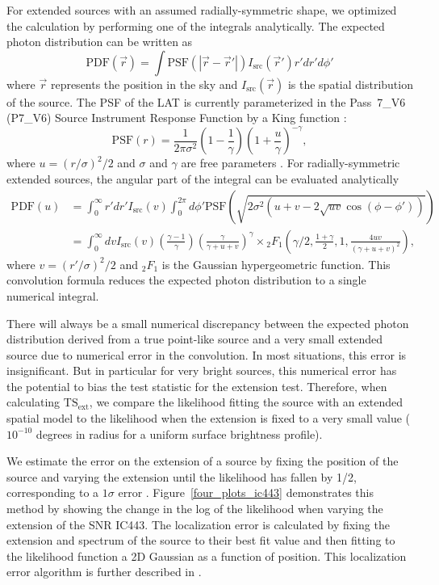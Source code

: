 \documentclass[12pt,preprint]{aastex}
\newcommand{\tsext}{{\ensuremath{\text{TS}_{\text{ext}}}}\xspace}
\begin{document}
For extended sources with an assumed radially-symmetric shape,
we optimized the calculation by performing one
of the integrals analytically.
The expected photon 
distribution can be written as
\begin{equation}
  \text{PDF}(\vec r) = \int  \text{PSF}(|\vec r - \vec r'|)I_\text{src}(\vec r') r' dr' d\phi'
\end{equation}
where $\vec r$ represents the position in the sky and
$I_\text{src}(\vec r)$ is the spatial distribution of the
source.
The PSF of the LAT is currently parameterized 
in the Pass~7\_V6 (P7\_V6) Source Instrument
Response Function \citep[IRFs,][]{lat_on_orbit_psf} by a King function \citep{king_function}:
\begin{equation}
  \text{PSF}(r) = 
  \frac{1}{2\pi\sigma^2}
  \left(1-\frac{1}{\gamma}\right)
  \left(1+\frac{u}{\gamma}\right)^{-\gamma},
\end{equation}
where $u=(r/\sigma)^2/2$ and $\sigma$ and $\gamma$ are free parameters
\citep{matthew_kerr_thesis}.  For radially-symmetric extended sources,
the angular part of the integral can be evaluated analytically
\begin{align}
  \text{PDF}(u) & = \int_0^\infty r' dr'
  I_\text{src}(v) 
  \int_0^{2\pi} d\phi' 
  \text{PSF}(\sqrt{2\sigma^2(u+v-2\sqrt{uv}\cos(\phi-\phi'))})
  \\
  & = \int_0^\infty dv
  I_\text{src}(v) 
  \left(\frac{\gamma-1}{\gamma}\right)
  \left( \frac{\gamma}{\gamma + u + v}\right)^\gamma 
  \times {}_2F_1 \left(\gamma/2,\frac{1+\gamma}{2},1,\frac{4uv}{(\gamma+u+v)^2}\right),
\end{align}
where $v=(r'/\sigma)^2/2$ and ${}_2F_1$ is the Gaussian hypergeometric
function.  This convolution formula reduces the expected photon
distribution to a single numerical integral.

There will always be a small numerical discrepancy between the expected
photon distribution derived from a true point-like source and a very small
extended source due to numerical error in the convolution.  In most
situations, this error is insignificant.  But in particular for
very bright sources, this numerical error has the potential to bias the
test statistic for the extension test. Therefore, when calculating
\tsext, we compare the likelihood fitting the source with an extended
spatial model to the likelihood when the extension is
fixed to a very small value ($10^{-10}$ degrees in radius 
for a uniform surface brightness profile).

We estimate the error on the extension of a source by fixing
the position of the source and varying the extension until the
likelihood has fallen by 1/2, corresponding to a $1\sigma$ error
\citep{Statistical_methods_book}.  Figure~\ref{four_plots_ic443}
demonstrates this method by showing the change in the log of the
likelihood when varying the extension of the SNR IC443.  The localization
error is calculated by fixing the extension and spectrum of the source
to their best fit value and then
fitting to the likelihood function a 2D Gaussian as a function
of position. This localization error algorithm is further described in
\cite{second_cat}.
\end{document}
